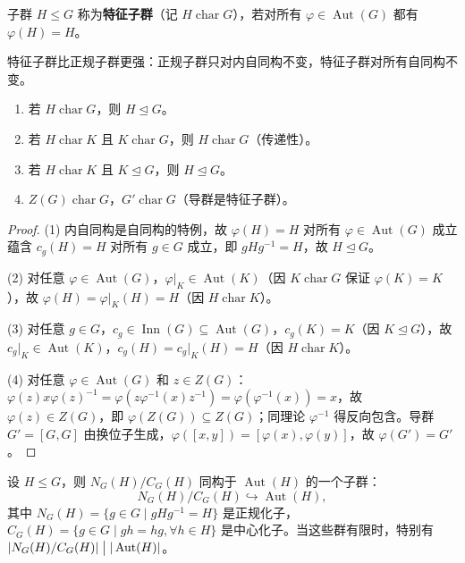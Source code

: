 \begin{definition}[特征子群]
子群 $H\leqslant G$ 称为\textbf{特征子群}（记 $H\operatorname{char}G$），若对所有 $\varphi\in\operatorname{Aut}(G)$ 都有 $\varphi(H)=H$。
\end{definition}

特征子群比正规子群更强：正规子群只对内自同构不变，特征子群对所有自同构不变。

\begin{proposition}[特征子群的性质]
\label{prop:characteristic-subgroup}
\begin{enumerate}
\item 若 $H\operatorname{char}G$，则 $H\mathrel{\trianglelefteq} G$。
\item 若 $H\operatorname{char}K$ 且 $K\operatorname{char}G$，则 $H\operatorname{char}G$（传递性）。
\item 若 $H\operatorname{char}K$ 且 $K\mathrel{\trianglelefteq} G$，则 $H\mathrel{\trianglelefteq} G$。
\item $Z(G)\operatorname{char}G$，$G'\operatorname{char}G$（导群是特征子群）。
\end{enumerate}
\end{proposition}

\begin{proof}
(1) 内自同构是自同构的特例，故 $\varphi(H)=H$ 对所有 $\varphi\in\operatorname{Aut}(G)$ 成立蕴含 $c_g(H)=H$ 对所有 $g\in G$ 成立，即 $gHg^{-1}=H$，故 $H\mathrel{\trianglelefteq} G$。

(2) 对任意 $\varphi\in\operatorname{Aut}(G)$，$\varphi|_K\in\operatorname{Aut}(K)$（因 $K\operatorname{char}G$ 保证 $\varphi(K)=K$），故 $\varphi(H)=\varphi|_K(H)=H$（因 $H\operatorname{char}K$）。

(3) 对任意 $g\in G$，$c_g\in\operatorname{Inn}(G)\subseteq\operatorname{Aut}(G)$，$c_g(K)=K$（因 $K\mathrel{\trianglelefteq} G$），故 $c_g|_K\in\operatorname{Aut}(K)$，$c_g(H)=c_g|_K(H)=H$（因 $H\operatorname{char}K$）。

(4) 对任意 $\varphi\in\operatorname{Aut}(G)$ 和 $z\in Z(G)$：$\varphi(z)x\varphi(z)^{-1}=\varphi(z\varphi^{-1}(x)z^{-1})=\varphi(\varphi^{-1}(x))=x$，故 $\varphi(z)\in Z(G)$，即 $\varphi(Z(G))\subseteq Z(G)$；同理论 $\varphi^{-1}$ 得反向包含。导群 $G'=[G,G]$ 由换位子生成，$\varphi([x,y])=[\varphi(x),\varphi(y)]$，故 $\varphi(G')=G'$。
\end{proof}

\begin{theorem}[$N/C$ 定理]
\label{thm:nc-theorem}
设 $H\leqslant G$，则 $N_G(H)/C_G(H)$ 同构于 $\operatorname{Aut}(H)$ 的一个子群：
\[
N_G(H)/C_G(H)\hookrightarrow\operatorname{Aut}(H),
\]
其中 $N_G(H)=\{g\in G\mid gHg^{-1}=H\}$ 是正规化子，$C_G(H)=\{g\in G\mid gh=hg,\forall h\in H\}$ 是中心化子。当这些群有限时，特别有 $|N_G(H)/C_G(H)|\bigm||\operatorname{Aut}(H)|$。
\end{theorem}

